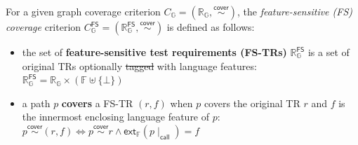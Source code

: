 \documentclass[acmsmall,review,screen]{acmart}
\newcommand{\name}[1]{\textsf{#1}}
\newcommand{\graph}{\mathbb{G}}
\newcommand{\pat}{p}
\newcommand{\cover}{\overset{\name{cover}}{\sim}}
\newcommand{\trset}[1]{\mathbb{R}_{#1}}
\newcommand{\tr}{r}
\newcommand{\cov}[1]{C_{#1}}
\newcommand{\featset}{\mathbb{F}}
\newcommand{\feat}{f}
\newcommand{\extfeat}{\name{ext}_\featset}
\newcommand{\css}[1]{{#1}\!\mid_{\name{call}}}
\newcommand{\fcov}[1]{\cov{#1}^{\name{FS}}}
\newcommand{\ftrset}[1]{\trset{#1}^{\name{FS}}}
\providecommand{\DIFdeltex}[1]{{\protect\color{red}\sout{#1}}}                      %
\providecommand{\DIFdelbegin}{} %
\providecommand{\DIFdelend}{} %
\providecommand{\DIFdel}[1]{\texorpdfstring{\DIFdeltex{#1}}{}} %
\newcommand{\DIFscaledelfig}{0.5}
\newlength{\DIFdelgraphicswidth} %
\newlength{\DIFdelgraphicsheight} %
\newcommand{\DIFdelincludegraphics}[2][]{%
\sbox{\DIFdelgraphicsbox}{\DIFOincludegraphics[#1]{#2}}%
\settoboxwidth{\DIFdelgraphicswidth}{\DIFdelgraphicsbox} %
\settoboxtotalheight{\DIFdelgraphicsheight}{\DIFdelgraphicsbox} %
\scalebox{\DIFscaledelfig}{%
\parbox[b]{\DIFdelgraphicswidth}{\usebox{\DIFdelgraphicsbox}\\[-\baselineskip] \rule{\DIFdelgraphicswidth}{0em}}\llap{\resizebox{\DIFdelgraphicswidth}{\DIFdelgraphicsheight}{%
\setlength{\unitlength}{\DIFdelgraphicswidth}%
\begin{picture}(1,1)%
\thicklines\linethickness{2pt} %
{\color[rgb]{1,0,0}\put(0,0){\framebox(1,1){}}}%
{\color[rgb]{1,0,0}\put(0,0){\line( 1,1){1}}}%
{\color[rgb]{1,0,0}\put(0,1){\line(1,-1){1}}}%
\end{picture}%
}\hspace*{3pt}}} %
} %
\DeclareRobustCommand{\DIFdelbegin}{\DIFOdelbegin \let\includegraphics\DIFdelincludegraphics} %
\DeclareRobustCommand{\DIFdelend}{\DIFOaddend \let\includegraphics\DIFOincludegraphics} %
\begin{document}

\begin{definition}\label{def:fs-cov}
  For a given graph coverage criterion $\cov{\graph} = (\trset{\graph},
  \cover)$, the \textit{feature-sensitive (FS) coverage} criterion
  $\fcov{\graph} = (\ftrset{\graph}, \cover)$ is defined as follows:
  \begin{itemize}
    \item the set of \textbf{feature-sensitive test requirements (FS-TRs)}
      $\ftrset{\graph}$ is a set of original TRs optionally \DIFdelbegin \DIFdel{tagged }\DIFdelend with language features:
$
        \ftrset{\graph} = \trset{\graph} \times (\featset \uplus \{ \bot \})
$
    \item a path $\pat$ \textbf{covers} a FS-TR $(\tr, \feat)$ when $\pat$
      covers the original TR $\tr$ and $\feat$ is the innermost enclosing language feature
      of $\pat$:
$
        \pat \cover (\tr, \feat) \iff \pat \cover \tr \wedge
        \extfeat(\css{\pat}) = \feat
$
  \end{itemize}
\end{definition}

\end{document}

